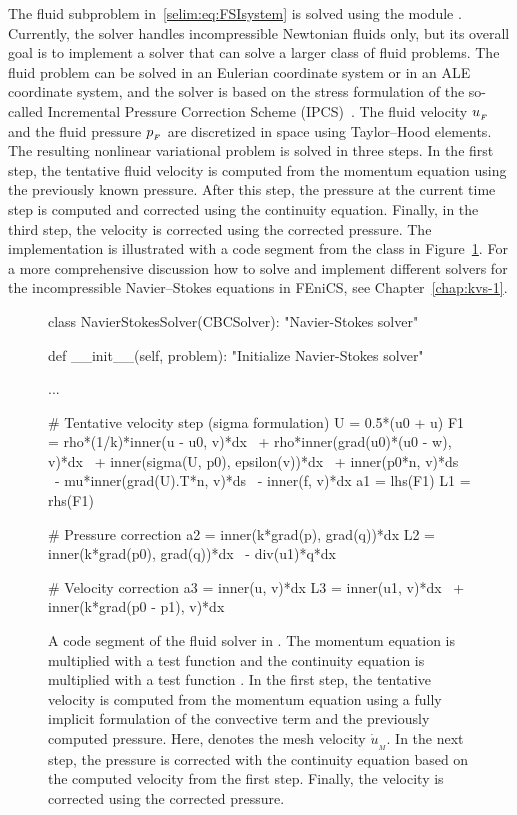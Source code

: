 The fluid subproblem in~\eqref{selim:eq:FSIsystem} is solved using the
 module . Currently, the solver
handles incompressible Newtonian fluids only, but its overall goal is
to implement a solver that can solve a larger class of fluid problems.
The fluid problem can be solved in an Eulerian coordinate system or in
an ALE coordinate system, and the solver is based on the stress
formulation of the so-called Incremental Pressure Correction Scheme
(IPCS)~\citep{Goda1979}. The fluid velocity $u_{_{F}}$ and the fluid
pressure $p_{_{F}}$ are discretized in space using Taylor--Hood
elements. The resulting nonlinear variational problem is solved in
three steps. In the first step, the tentative fluid velocity is
computed from the momentum equation using the previously known
pressure. After this step, the pressure at the current time step is
computed and corrected using the continuity equation. Finally, in the
third step, the velocity is corrected using the corrected pressure.
The implementation is illustrated with a code segment from the class
 in Figure~\ref{selim:fig:fluidsolver}. For
a more comprehensive discussion how to solve and implement different
solvers for the incompressible Navier--Stokes equations in FEniCS, see
Chapter~\ref{chap:kvs-1}.
\begin{figure}
\begin{center}
\begin{python}
 class NavierStokesSolver(CBCSolver):
    "Navier-Stokes solver"

   def __init__(self, problem):
        "Initialize Navier-Stokes solver"

        ...

        # Tentative velocity step (sigma formulation)
        U = 0.5*(u0 + u)
        F1 = rho*(1/k)*inner(u - u0, v)*dx \
           + rho*inner(grad(u0)*(u0 - w), v)*dx \
           + inner(sigma(U, p0), epsilon(v))*dx \
           + inner(p0*n, v)*ds \
           - mu*inner(grad(U).T*n, v)*ds \
           - inner(f, v)*dx
        a1 = lhs(F1)
        L1 = rhs(F1)

        # Pressure correction
        a2 = inner(k*grad(p), grad(q))*dx
        L2 = inner(k*grad(p0), grad(q))*dx \
           - div(u1)*q*dx

        # Velocity correction
        a3 = inner(u, v)*dx
        L3 = inner(u1, v)*dx \
           + inner(k*grad(p0 - p1), v)*dx
\end{python}
\caption{A code segment of the fluid solver in . The
  momentum equation is multiplied with a test function  and
  the continuity equation is multiplied with a test function
  \emp{q}. In the first step, the tentative velocity is computed
  from the momentum equation using a fully implicit formulation of the
  convective term and the previously computed pressure. Here, 
  denotes the mesh velocity $\dot{u}_{_{M}}$. In the next step, the
  pressure is corrected with the continuity equation based on the
  computed velocity \emp{u1} from the first step. Finally, the
  velocity is corrected using the corrected pressure.}
\label{selim:fig:fluidsolver}
\end{center}
\end{figure}

